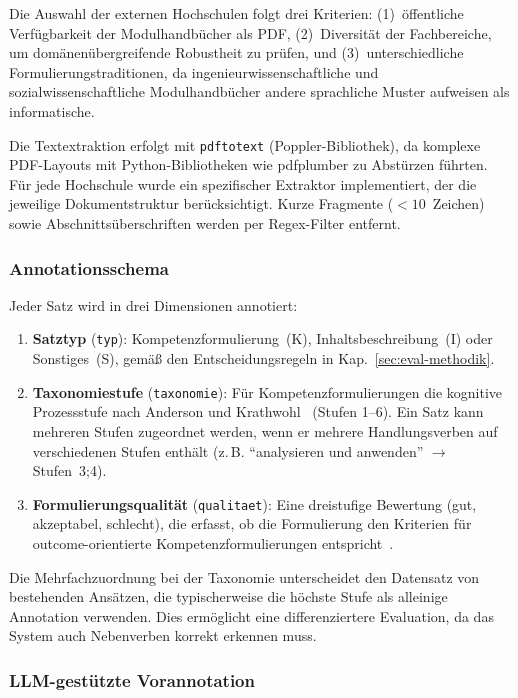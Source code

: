 Die Auswahl der externen Hochschulen folgt drei Kriterien: (1)~öffentliche Verfügbarkeit der Modulhandbücher als PDF, (2)~Diversität der Fachbereiche, um domänenübergreifende Robustheit zu prüfen, und (3)~unterschiedliche Formulierungstraditionen, da ingenieurwissenschaftliche und sozialwissenschaftliche Modulhandbücher andere sprachliche Muster aufweisen als informatische.

Die Textextraktion erfolgt mit \texttt{pdftotext} (Poppler-Bibliothek), da komplexe PDF-Layouts mit Python-Bibliotheken wie pdfplumber zu Abstürzen führten.
Für jede Hochschule wurde ein spezifischer Extraktor implementiert, der die jeweilige Dokumentstruktur berücksichtigt.
Kurze Fragmente ($< 10$~Zeichen) sowie Abschnittsüberschriften werden per Regex-Filter entfernt.

\subsubsection{Annotationsschema}\label{sec:eval-schema}

Jeder Satz wird in drei Dimensionen annotiert:

\begin{enumerate}
  \item \textbf{Satztyp} (\texttt{typ}): Kompetenzformulierung~(K), Inhaltsbeschreibung~(I) oder Sonstiges~(S), gemäß den Entscheidungsregeln in Kap.~\ref{sec:eval-methodik}.
  \item \textbf{Taxonomiestufe} (\texttt{taxonomie}): Für Kompetenzformulierungen die kognitive Prozessstufe nach Anderson und Krathwohl~\cite{anderson2001taxonomy} (Stufen 1--6). Ein Satz kann mehreren Stufen zugeordnet werden, wenn er mehrere Handlungsverben auf verschiedenen Stufen enthält (z.\,B. \enquote{analysieren und anwenden} $\rightarrow$ Stufen~3;4).
  \item \textbf{Formulierungsqualität} (\texttt{qualitaet}): Eine dreistufige Bewertung (gut, akzeptabel, schlecht), die erfasst, ob die Formulierung den Kriterien für outcome-orientierte Kompetenzformulierungen entspricht~\cite{hrknexus2015lernergebnisse}.
\end{enumerate}

Die Mehrfachzuordnung bei der Taxonomie unterscheidet den Datensatz von bestehenden Ansätzen, die typischerweise die höchste Stufe als alleinige Annotation verwenden.
Dies ermöglicht eine differenziertere Evaluation, da das System auch Nebenverben korrekt erkennen muss.

\subsubsection{LLM-gestützte Vorannotation}\label{sec:eval-vorannotation}

